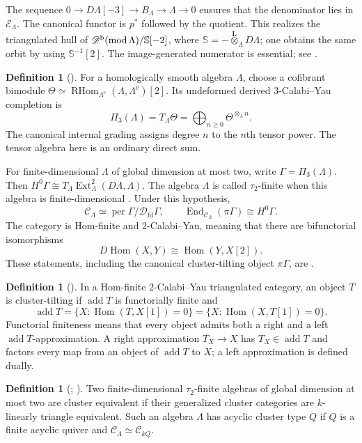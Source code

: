 \documentclass[12pt,a4paper,english,reqno]{amsart}
\theoremstyle{plain}
\theoremstyle{definition}
\newtheorem{dfn*}[thm]{Definition}
\numberwithin{equation}{section}
\def\ta{\tau}
\def\Ga{\Gamma}
\def\La{\Lambda}
\def\Th{\Theta}
\def\Hom{\operatorname{Hom}}
\def\End{\operatorname{End}}
\def\add{\operatorname{add}}
\def\Db{{\mathcal D}^{\text{\rm b}}}
\def\perf{\operatorname{per}}
\def\calC{{\mathcal C}}
\def\calD{{\mathcal D}}
\def\iso{\cong}
\def\ox{\otimes}
\def\Lox{\overset{\mathbf{L}}{\otimes}}
\def\Ds{\bigoplus}
\def\RHom{\operatorname{RHom}}
\def\fd{\mathrm{fd}}
\begin{document}
The sequence $0\to D\La[-3]\to B_\La\to\La\to0$ ensures that
the denominator lies in $\mathcal E_\La$. The canonical functor is
$p^*$ followed by the quotient. This realizes the triangulated hull
of $\Db(\operatorname{mod}\La)/\mathbb S[-2]$, where
$\mathbb S=-\Lox_\La D\La$; one obtains the
same orbit by using $\mathbb S^{-1}[2]$. The image-generated numerator is essential; see
\cite[Section 1]{KellerOrbitCorr}.

\begin{dfn*}[{\cite[Section 4.1]{Keller}}]\label{def:cy-completion}
For a homologically smooth algebra $\La$, choose a cofibrant bimodule
$\Th\simeq\RHom_{\La^e}(\La,\La^e)[2]$.
Its undeformed derived $3$-Calabi--Yau completion is
\[
 \Pi_3(\La)=T_\La\Th=\Ds_{n\ge0}\Th^{\ox_\La n}.
\]
The canonical internal grading assigns degree $n$ to the $n$th tensor
power. The tensor algebra here is an ordinary direct sum.
\end{dfn*}

For finite-dimensional $\La$ of global dimension at most two,
write $\Ga=\Pi_3(\La)$. Then
$H^0\Ga\iso T_\La\operatorname{Ext}^2_\La(D\La,\La)$.
The algebra $\La$ is called $\ta_2$-finite when this algebra is
finite-dimensional \cite[Section 2]{AO}. Under this hypothesis,
\[
 \calC_\La\simeq\perf\Ga/\calD_{\fd}\Ga,
 \qquad \End_{\calC_\La}(\pi\Ga)\iso H^0\Ga.
\]
The category is Hom-finite and $2$-Calabi--Yau, meaning that there are
bifunctorial isomorphisms
\[
 D\Hom(X,Y)\iso\Hom(Y,X[2]).
\]
These statements,
including the canonical cluster-tilting object $\pi\Ga$, are
\cite[Theorem 2.1, Proposition 4.9 and Theorem 4.10]{Amiot}.

\begin{dfn*}[{\cite[Section 2]{Amiot}}]\label{def:cluster-tilting}
In a Hom-finite $2$-Calabi--Yau triangulated category, an object $T$
is cluster-tilting if $\add T$ is functorially finite and
\[
 \add T=\{X:\Hom(T,X[1])=0\}
        =\{X:\Hom(X,T[1])=0\}.
\]
Functorial finiteness means that every object admits both a right and
a left $\add T$-approximation. A right approximation $T_X\to X$
has $T_X\in\add T$ and factors every map from an object of $\add T$
to $X$; a left approximation is defined dually.
\end{dfn*}

\begin{dfn*}[{\cite[Section 2]{AO}; \cite[Definition 3.1]{AOTree}}]\label{def:cluster-type}
Two finite-dimensional $\ta_2$-finite algebras of global dimension
at most two are cluster equivalent if their generalized cluster
categories are $k$-linearly triangle equivalent. Such an algebra
$\La$ has acyclic cluster type $Q$ if $Q$ is a finite acyclic quiver
and $\calC_\La\simeq\calC_{kQ}$.
\end{dfn*}
\end{document}
